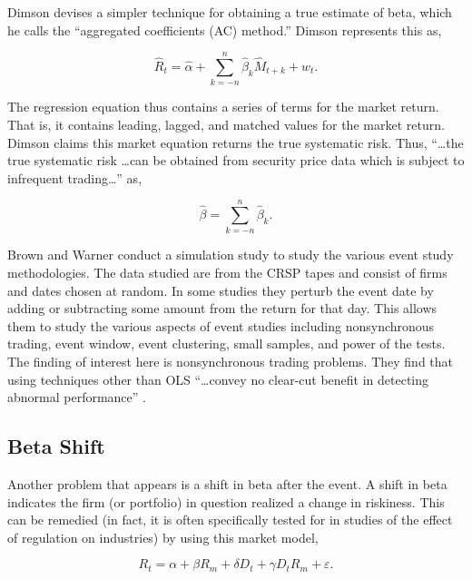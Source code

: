 Dimson \cite{dimson79} devises a simpler technique for obtaining a true estimate of beta, which he calls the ``aggregated coefficients (AC) method.'' Dimson represents this as,

\begin{equation}
\hat R_t=\hat \alpha+ \sum_{k=-n}^{n} \hat \beta_k \hat M_{t+k}+w_{t}.
\end{equation}

The regression equation thus contains a series of terms for the market return. That is, it contains leading, lagged, and matched values for the market return. Dimson claims this market equation returns the true systematic risk. Thus, ``\ldots the true systematic risk \ldots can be obtained from security price data which is subject to infrequent trading\ldots'' \cite[p. 204]{dimson79} as,

\begin{equation}
\hat \beta = \sum_{k=-n}^{n} \hat \beta_{k}.
\end{equation}

Brown and Warner \cite{brownwarner83} conduct a simulation study to study the various event study methodologies. The data studied are from the CRSP tapes and consist of firms and dates chosen at random. In some studies they perturb the event date by adding or subtracting some amount from the return for that day. This allows them to study the various aspects of event studies including nonsynchronous trading, event window, event clustering, small samples, and power of the tests. The finding of interest here is nonsynchronous trading problems. They find that using techniques other than OLS ``\ldots convey no clear-cut benefit in detecting abnormal performance'' \cite[p. 26]{brownwarner83}.

\subsection{Beta Shift}

Another problem that appears is a shift in beta after the event. A shift in beta indicates the firm (or portfolio) in question realized a change in riskiness. This can be remedied (in fact, it is often specifically tested for in studies of the effect of regulation on industries) by using this market model,

\begin{equation}
R_{t}=\alpha+\beta R_{m} + \delta D_{t} + \gamma D_{t} R_{m} + \varepsilon.
\end{equation}

